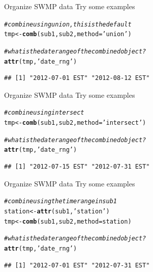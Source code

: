 \documentclass[xcolor=svgnames]{beamer}\usepackage[]{graphicx}\usepackage[]{color}
\makeatletter
\newcommand{\hlstr}[1]{\textcolor[rgb]{0.192,0.494,0.8}{#1}}%
\newcommand{\hlcom}[1]{\textcolor[rgb]{0.678,0.584,0.686}{\textit{#1}}}%
\newcommand{\hlstd}[1]{\textcolor[rgb]{0.345,0.345,0.345}{#1}}%
\newcommand{\hlkwb}[1]{\textcolor[rgb]{0.69,0.353,0.396}{#1}}%
\newcommand{\hlkwc}[1]{\textcolor[rgb]{0.333,0.667,0.333}{#1}}%
\newcommand{\hlkwd}[1]{\textcolor[rgb]{0.737,0.353,0.396}{\textbf{#1}}}%
\newenvironment{kframe}{%
 \def\at@end@of@kframe{}%
 \ifinner\ifhmode%
  \def\at@end@of@kframe{\end{minipage}}%
  \begin{minipage}{\columnwidth}%
 \fi\fi%
 \def\FrameCommand##1{\hskip\@totalleftmargin \hskip-\fboxsep
 \colorbox{shadecolor}{##1}\hskip-\fboxsep
     \hskip-\linewidth \hskip-\@totalleftmargin \hskip\columnwidth}%
 \MakeFramed {\advance\hsize-\width
   \@totalleftmargin\z@ \linewidth\hsize
   \@setminipage}}%
 {\par\unskip\endMakeFramed%
 \at@end@of@kframe}
\newenvironment{knitrout}{}{} %
\makeatother
\begin{document}
\begin{frame}[containsverbatim]{Organize SWMP data}
Try some examples
\begin{knitrout}\scriptsize
{}\color{fgcolor}\begin{kframe}
\begin{alltt}
\hlcom{# combine using union, this is the default}
\hlstd{tmp} \hlkwb{<-} \hlkwd{comb}\hlstd{(sub1, sub2,} \hlkwc{method} \hlstd{=} \hlstr{'union'}\hlstd{)}

\hlcom{# what is the date range of the combined object?}
\hlkwd{attr}\hlstd{(tmp,} \hlstr{'date_rng'}\hlstd{)}
\end{alltt}
\begin{verbatim}
## [1] "2012-07-01 EST" "2012-08-12 EST"
\end{verbatim}
\end{kframe}
\end{knitrout}
\end{frame}

\begin{frame}[containsverbatim]{Organize SWMP data}
Try some examples
\begin{knitrout}\scriptsize
{}\color{fgcolor}\begin{kframe}
\begin{alltt}
\hlcom{# combine using intersect}
\hlstd{tmp} \hlkwb{<-} \hlkwd{comb}\hlstd{(sub1, sub2,} \hlkwc{method} \hlstd{=} \hlstr{'intersect'}\hlstd{)}

\hlcom{# what is the date range of the combined object?}
\hlkwd{attr}\hlstd{(tmp,} \hlstr{'date_rng'}\hlstd{)}
\end{alltt}
\begin{verbatim}
## [1] "2012-07-15 EST" "2012-07-31 EST"
\end{verbatim}
\end{kframe}
\end{knitrout}
\end{frame}

\begin{frame}[containsverbatim]{Organize SWMP data}
Try some examples
\begin{knitrout}\scriptsize
{}\color{fgcolor}\begin{kframe}
\begin{alltt}
\hlcom{# combine using the time range in sub1}
\hlstd{station} \hlkwb{<-} \hlkwd{attr}\hlstd{(sub1,} \hlstr{'station'}\hlstd{)}
\hlstd{tmp} \hlkwb{<-} \hlkwd{comb}\hlstd{(sub1, sub2,} \hlkwc{method} \hlstd{= station)}

\hlcom{# what is the date range of the combined object?}
\hlkwd{attr}\hlstd{(tmp,} \hlstr{'date_rng'}\hlstd{)}
\end{alltt}
\begin{verbatim}
## [1] "2012-07-01 EST" "2012-07-31 EST"
\end{verbatim}
\end{kframe}
\end{knitrout}
\end{frame}
\end{document}
